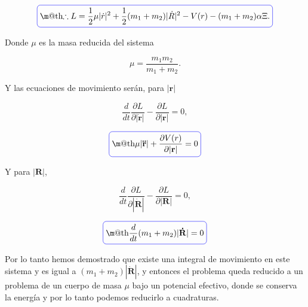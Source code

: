 \documentclass[a4paper,10pt]{article}
\makeatletter
\numberwithin{equation}{section}
\newcommand*{\boxcolor}{blue}
\renewcommand{\boxed}[1]{\textcolor{\boxcolor}{%
\tikz[baseline={([yshift=-1ex]current bounding box.center)}] \node [rectangle, minimum width=1ex,rounded corners,draw] {\normalcolor\m@th$\displaystyle#1$};}}
\makeatother
\begin{document}
\begin{equation}
 \boxed{\therefore L = \frac{1}{2}\mu |\dot{r}|^2 + \frac{1}{2}(m_1 + m_2)|\dot{R}|^2 - V(r) - (m_1 + m_2)\alpha \Xi.}
\end{equation}

Donde $\mu$ es la masa reducida del sistema

\begin{equation}
 \mu = \frac{m_1 m_2}{m_1 + m_2}.
\end{equation}

Y las ecuaciones de movimiento serán, para $|\mathbf{r}|$

\begin{equation}
\frac{d}{dt}\frac{\partial L }{\partial|\mathbf{\dot{r}}|} - \frac{\partial L}{\partial |\mathbf{r}|} = 0,
\end{equation}

\begin{equation}
 \boxed{\mu |\mathbf{\ddot{r}}| + \frac{\partial V(r)}{\partial |\mathbf{r}|} = 0}
\end{equation}

Y para $|\mathbf{R}|$,

\begin{equation}
\frac{d}{dt}\frac{\partial L }{\partial|\mathbf{\dot{R}}|} - \frac{\partial L}{\partial |\mathbf{R}|} = 0,
\end{equation}

\begin{equation}
 \boxed{\frac{d}{dt}(m_1 + m_2)|\mathbf{\dot{R}}| = 0}
\end{equation}

Por lo tanto hemos demostrado que existe una integral de movimiento en este sistema 
y es igual a $(m_1 + m_2)|\mathbf{\dot{R}}|$, y entonces el problema queda reducido a un 
problema de un cuerpo de masa $\mu$ bajo un potencial efectivo, donde se conserva la 
energía y por lo tanto podemos reducirlo a cuadraturas.
\end{document}
